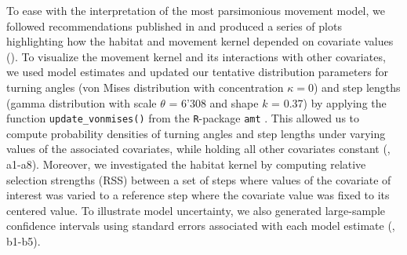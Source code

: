\documentclass[../FinalThesis.tex]{subfiles}
\begin{document}
To ease with the interpretation of the most parsimonious movement model, we
followed recommendations published in \citet{Fieberg.2021} and produced a series
of plots highlighting how the habitat and movement kernel depended on covariate
values (). To visualize the movement kernel and its
interactions with other covariates, we used model estimates and updated our
tentative distribution parameters for turning angles (von Mises distribution
with concentration \(\kappa = 0\)) and step lengths (gamma distribution with
scale \(\theta\) = 6'308 and shape \(k\) = 0.37) by applying the function
\texttt{update\_vonmises()} from the \texttt{R}-package \texttt{amt}
\citep{Signer.2019}. This allowed us to compute probability densities of turning
angles and step lengths under varying values of the associated covariates, while
holding all other covariates constant (, a1-a8). Moreover,
we investigated the habitat kernel by computing relative selection strengths
(RSS) between a set of steps where values of the covariate of interest was
varied to a reference step where the covariate value was fixed to its centered
value. To illustrate model uncertainty, we also generated large-sample
confidence intervals using standard errors associated with each model estimate
(, b1-b5).
\end{document}

